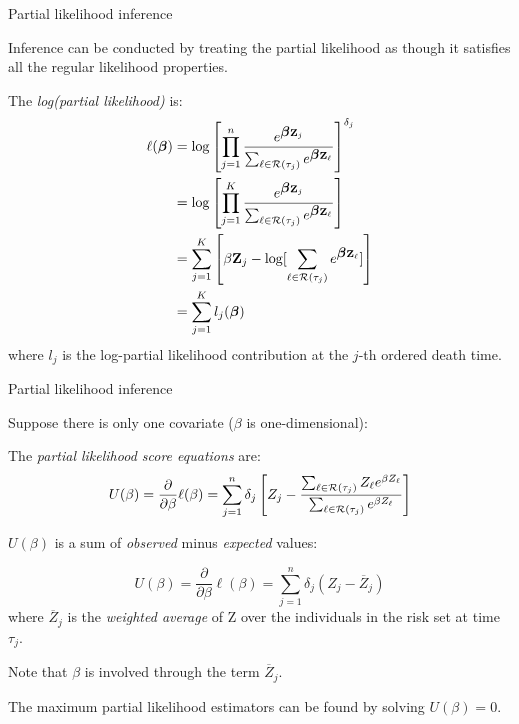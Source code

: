 \documentclass[ignorenonframetext,]{beamer}
\newcommand{\bbeta}{\mbox{\boldmath$\beta$}}
\begin{document}
\begin{frame}{%
\protect\hypertarget{partial-likelihood-inference}{%
Partial likelihood inference}}

Inference can be conducted by treating the partial likelihood as though
it satisfies all the regular likelihood properties.

The \emph{log(partial likelihood)} is: \begin{align*}
\ell(\bbeta)   &= \log \left[ \prod_{j=1}^{n}    \frac 
  {   e^{\bbeta {\bf Z}_j } }   {\sum_{\ell \in {\cal R}(\tau_j)}
        e^{\bbeta {\bf Z}_\ell} } \right]^{\delta_j}  \\
       &= \log \left[ \prod_{j=1}^{K}    \frac 
  {   e^{\bbeta {\bf Z}_j } }   {\sum_{\ell \in {\cal R}(\tau_j)}
        e^{\bbeta {\bf Z}_\ell} } \right]  \\
 &= \sum_{j=1}^{K}   \left[ \beta {\bf Z}_j  - 
      \log [\sum_{\ell \in {\cal R}(\tau_j)} e^{\bbeta {\bf Z}_\ell}] \right]  \\
 &=  \sum _{j=1}^{K}  l_j (\bbeta) 
\end{align*} where \(l_j\) is the log-partial likelihood contribution at
the \(j\)-th ordered death time.

\end{frame}

\begin{frame}{%
\protect\hypertarget{partial-likelihood-inference-1}{%
Partial likelihood inference}}

Suppose there is only one covariate (\(\beta\) is one-dimensional):

The \emph{partial likelihood score equations} are:
\[   U(\beta) = \frac{\partial}{\partial \beta} \ell(\beta) = 
    \sum_{j=1}^{n}   \delta_j \left[   Z_j  -  
      \frac{ \sum_{\ell \in {\cal R}(\tau_j)}  Z_\ell e^{\beta  Z_\ell} }
          { \sum_{\ell \in {\cal R}(\tau_j)}   e^{\beta  Z_\ell} } \right]
\]

\(U(\beta)\) is a sum of \emph{observed} minus \emph{expected} values:

\[   U(\beta) = \frac{\partial}{\partial \beta} \ell(\beta) = 
    \sum_{j=1}^{n}  \delta_j 
    (   Z_j  -  \overline{Z}_j  )  \] where \(\overline{Z}_j\) is the
\emph{weighted average} of Z over the individuals in the risk set at
time \(\tau_j\).

Note that \(\beta\) is involved through the term \(\overline{Z}_j\).

The maximum partial likelihood estimators can be found by solving
\(U(\beta) =0\).

\end{frame}
\end{document}
